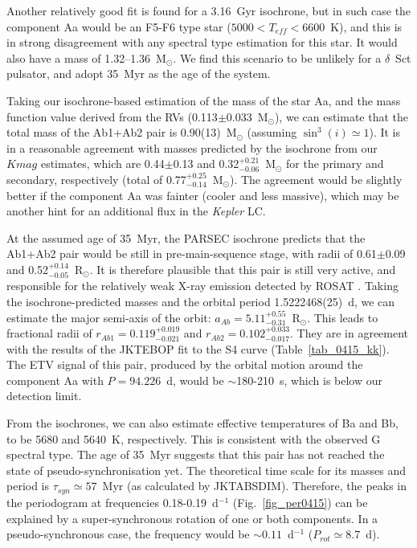 \documentclass{aa}
\newcommand{\kep}{{\it Kepler }}
\begin{document}
Another relatively good fit is found for a 3.16~Gyr isochrone, but in such case the 
component Aa would be an F5-F6 type star ($5000<T_{eff}<6600$~K), and this is in strong
disagreement with any spectral type estimation for this star. It would also have a 
mass of 1.32--1.36~M$_\odot$. We find this scenario to be unlikely for a $\delta$~Sct 
pulsator, and adopt 35~Myr as the age of the system.

Taking our isochrone-based estimation of the mass of the star Aa, and the mass function 
value derived from the RVs (0.113$\pm$0.033~M$_\odot$), we can estimate that the total
mass of the Ab1+Ab2 pair is 0.90(13)~M$_\odot$ (assuming $\sin^3(i)\simeq1$).
It is in a reasonable agreement with masses predicted by the isochrone from our
$Kmag$ estimates, which are 0.44$\pm$0.13 and 0.32$^{+0.21}_{-0.06}$~M$_\odot$ for the
primary and secondary, respectively (total of 0.77$^{+0.25}_{-0.14}$~M$_\odot$). 
The agreement would be slightly better if the component Aa was fainter (cooler and less 
massive), which may be another hint for an additional flux in the \kep LC.

At the assumed age of 35~Myr, the PARSEC isochrone predicts that the Ab1+Ab2 pair 
would be still in pre-main-sequence stage, with radii of 0.61$\pm$0.09 and 
0.52$^{+0.14}_{-0.05}$~R$_\odot$. It is therefore plausible that this pair is 
still very active, and responsible for the relatively weak X-ray emission detected by
ROSAT \citep{vog00}. Taking the isochrone-predicted masses and the orbital
period 1.5222468(25)~d, we can estimate the major semi-axis of the orbit:
$a_{Ab}=5.11^{+0.55}_{-0.31}$~R$_\odot$. This leads to fractional radii of 
$r_{Ab1}=0.119_{-0.021}^{+0.019}$ and $r_{Ab2}=0.102^{+0.033}_{-0.017}$. They are 
in agreement with the results of the JKTEBOP fit to the S4 curve (Table~\ref{tab_0415_kk}).
The ETV signal of this pair, produced by the orbital motion around the component Aa 
with $P=94.226$~d, would be $\sim$180-210~s, which is below our detection limit. 

From the isochrones, we can also estimate effective temperatures of Ba and Bb, 
to be 5680 and 5640~K, respectively. This is consistent with the observed G spectral 
type. The age of 35~Myr suggests that this pair has not reached the state
of pseudo-synchronisation yet. The theoretical time scale for its masses and
period is $\tau_{syn}\simeq57$~Myr (as calculated by JKTABSDIM). Therefore, 
the peaks in the periodogram at frequencies 0.18-0.19~d$^{-1}$ (Fig.~\ref{fig_per0415}) 
can be explained by a super-synchronous rotation of one or both components. 
In a pseudo-synchronous case, the frequency would be $\sim0.11$~d$^{-1}$
($P_{rot}\simeq8.7$~d).
\end{document}
